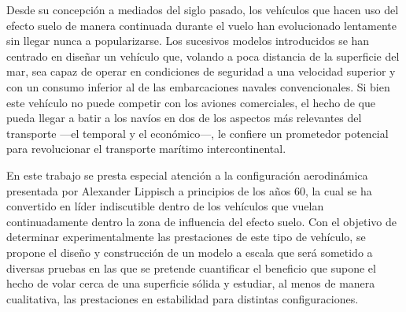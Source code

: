 Desde su concepción a mediados del siglo pasado, los vehículos que hacen uso del efecto suelo de manera continuada durante el vuelo han evolucionado lentamente sin llegar nunca a popularizarse. Los sucesivos modelos introducidos se han centrado en diseñar un vehículo que, volando a poca distancia de la superficie del mar, sea capaz de operar en condiciones de seguridad a una velocidad superior y con un consumo inferior al de las embarcaciones navales convencionales. Si bien este vehículo no puede competir con los aviones comerciales, el hecho de que pueda llegar a batir a los navíos en dos de los aspectos más relevantes del transporte —el temporal y el económico—, le confiere un prometedor potencial para revolucionar el transporte marítimo intercontinental.

En este trabajo se presta especial atención a la configuración aerodinámica presentada por Alexander Lippisch a principios de los años 60, la cual se ha convertido en líder indiscutible dentro de los vehículos que vuelan continuadamente dentro la zona de influencia del efecto suelo. Con el objetivo de determinar experimentalmente las prestaciones de este tipo de vehículo, se propone el diseño y construcción de un modelo a escala que será sometido a diversas pruebas en las que se pretende cuantificar el beneficio que supone el hecho de volar cerca de una superficie sólida y estudiar, al menos de manera cualitativa, las prestaciones en estabilidad para distintas configuraciones.